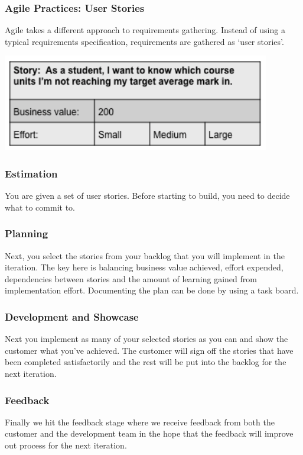 \documentclass{article}
\begin{document}
\subsubsection{Agile Practices: User Stories}
Agile takes a different approach to requirements gathering. Instead of using a typical requirements specification, requirements are gathered as `user stories'.
\begin{center}
	\includegraphics[scale=0.5]{user-story.png}
\end{center}
\subsubsection{Estimation}
You are given a set of user stories. Before starting to build, you need to decide what to commit to.
\subsubsection{Planning}
Next, you select the stories from your backlog that you will implement in the iteration. The key here is balancing business value achieved, effort expended, dependencies between stories and the amount of learning gained from implementation effort. Documenting the plan can be done by using a task board.
\subsubsection{Development and Showcase}
Next you implement as many of your selected stories as you can and show the customer what you've achieved. The customer will sign off the stories that have been completed satisfactorily and the rest will be put into the backlog for the next iteration.
\subsubsection{Feedback}
Finally we hit the feedback stage where we receive feedback from both the customer and the development team in the hope that the feedback will improve out process for the next iteration.
\end{document}
